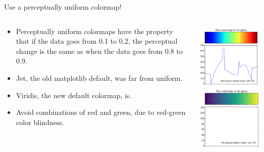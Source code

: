 \documentclass[aspectratio=169]{../latex_main/tntbeamer}  %
\begin{document}
	
	\begin{frame}{Use a perceptually uniform colormap!}
	
	    \vspace{-2em}
	    \begin{columns}
	        \begin{column}{.6\textwidth}
	        
	                \begin{itemize}
	                    \item Perceptually uniform colormaps have the property that if the data goes from 0.1 to 0.2, the perceptual change is the same as when the data goes from 0.8 to 0.9.
	                    \item Jet, the old matplotlib default, was far from uniform.
	                    \item Viridis, the new default colormap, is.
	                    \item Avoid combinations of red and green, due to red-green color blindness.
	                \end{itemize}
	        \end{column}
	        
	        
	        \begin{column}{.4\textwidth}

	                    \centering
	                    \includegraphics[scale=.33]{Bild63}

	        \end{column}
	    \end{columns}
	\end{frame}
	
\end{document}
